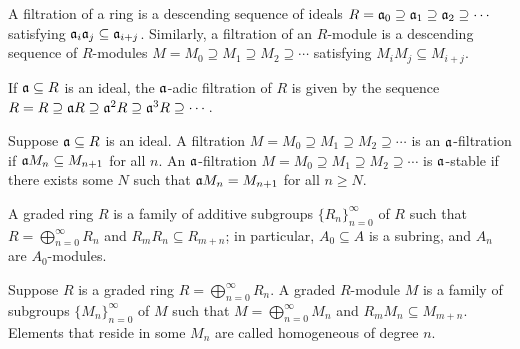 \begin{definition}
    A filtration of a ring is a descending sequence of ideals
    \(R = \mathfrak{a}_0 \supseteq \mathfrak{a}_1 \supseteq \mathfrak{a}_2 \supseteq \cdots\)
    satisfying \(\mathfrak{a}_i\mathfrak{a}_j \subseteq \mathfrak{a}_{i+j}\).
    Similarly, a filtration of an \(R\)-module is a descending sequence of \(R\)-modules
    \(M = M_0 \supseteq M_1 \supseteq M_2 \supseteq \cdots\)
    satisfying \(M_i M_j \subseteq M_{i+j}\).
\end{definition}
\begin{definition}
    If \(\mathfrak{a} \subseteq R\) is an ideal,
    the \(\mathfrak{a}\)-adic filtration of \(R\) is given by the sequence
    \(R = R \supseteq \mathfrak{a}R \supseteq \mathfrak{a}^2R \supseteq \mathfrak{a}^3R \supseteq \cdots\).
\end{definition}
\begin{definition}
    Suppose \(\mathfrak{a} \subseteq R\) is an ideal.
    A filtration \(M = M_0 \supseteq M_1 \supseteq M_2 \supseteq \cdots\) is an \(\mathfrak{a}\)-filtration
    if \(\mathfrak{a}M_n \subseteq M_{n+1}\) for all \(n\).
    An \(\mathfrak{a}\)-filtration \(M = M_0 \supseteq M_1 \supseteq M_2 \supseteq \cdots\) is \(\mathfrak{a}\)-stable
    if there exists some \(N\) such that \(\mathfrak{a}M_n = M_{n+1}\) for all \(n \geq N\).
\end{definition}

\begin{definition}
    A graded ring \(R\) is a family of additive subgroups \({\{R_n\}}_{n=0}^\infty\) of \(R\)
    such that \(R = \bigoplus_{n=0}^\infty R_n\) and \(R_m R_n \subseteq R_{m+n}\);
    in particular, \(A_0 \subseteq A\) is a subring, and \(A_n\) are \(A_0\)-modules.
\end{definition}
\begin{definition}
    Suppose \(R\) is a graded ring \(R = \bigoplus_{n=0}^\infty R_n\).
    A graded \(R\)-module \(M\) is a family of subgroups \({\{M_n\}}_{n=0}^\infty\) of \(M\)
    such that \(M = \bigoplus_{n=0}^\infty M_n\) and \(R_m M_n \subseteq M_{m+n}\).
    Elements that reside in some \(M_n\) are called homogeneous of degree \(n\).
\end{definition}

